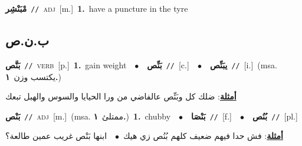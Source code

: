 \documentclass[10pt,a4paper,twoside]{article} %
\begin{document}
\begin{multicols}{2}
{\setlength\topsep{0pt}\textbf{\foreignlanguage{arabic}{مْبَنْشِر}}\ {\color{gray}\texttt{//}\color{black}}\ \textsc{adj}\ [m.]\ \textbf{1.}~have a puncture in the tyre\ } \vspace{2mm}

\vspace{-3mm}
\subsection*{\color{blue}\foreignlanguage{arabic}{ب.ن.ص}\color{blue}{}} 

{\setlength\topsep{0pt}\textbf{\foreignlanguage{arabic}{بَنَّص}}\ {\color{gray}\texttt{//}\color{black}}\ \textsc{verb}\ [p.]\ \textbf{1.}~gain weight\ \ $\bullet$\ \ \setlength\topsep{0pt}\textbf{\foreignlanguage{arabic}{بَنِّص}}\ {\color{gray}\texttt{//}\color{black}}\ [c.]\ \ $\bullet$\ \ \setlength\topsep{0pt}\textbf{\foreignlanguage{arabic}{يبَنِّص}}\ {\color{gray}\texttt{//}\color{black}}\ [i.]\ \color{gray}(msa. \foreignlanguage{arabic}{يكتسب وزن}~\foreignlanguage{arabic}{\textbf{١.}})\color{black}\  \begin{flushright}\color{gray}\foreignlanguage{arabic}{\textbf{\underline{\foreignlanguage{arabic}{أمثلة}}}: ضلك كل وبَنِّص عالفاضي من ورا الحيايا والسوس والهبل تبعك}\end{flushright}\color{black}} \vspace{2mm}

{\setlength\topsep{0pt}\textbf{\foreignlanguage{arabic}{بَنْص}}\ {\color{gray}\texttt{//}\color{black}}\ \textsc{adj}\ [m.]\ \color{gray}(msa. \foreignlanguage{arabic}{ممتلئ}~\foreignlanguage{arabic}{\textbf{١.}})\color{black}\ \textbf{1.}~chubby\ \ $\bullet$\ \ \setlength\topsep{0pt}\textbf{\foreignlanguage{arabic}{بَنْصَا}}\ {\color{gray}\texttt{//}\color{black}}\ [f.]\ \ $\bullet$\ \ \setlength\topsep{0pt}\textbf{\foreignlanguage{arabic}{بُنُص}}\ {\color{gray}\texttt{//}\color{black}}\ [pl.]\  \begin{flushright}\color{gray}\foreignlanguage{arabic}{\textbf{\underline{\foreignlanguage{arabic}{أمثلة}}}: فش حدا فيهم ضعيف كلهم بُنُص زي هيك\ $\bullet$\ \  ابنها بَنْص غريب عمين طالعة؟}\end{flushright}\color{black}} \vspace{2mm}


\end{multicols}
\end{document}
